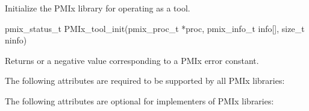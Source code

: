 \summary

Initialize the \ac{PMIx} library for operating as a tool.

\format

\cspecificstart
\begin{codepar}
pmix_status_t
PMIx_tool_init(pmix_proc_t *proc,
               pmix_info_t info[], size_t ninfo)
\end{codepar}
\cspecificend

\begin{arglist}
\end{arglist}

Returns  or a negative value corresponding to a PMIx error constant.

\reqattrstart
The following attributes are required to be supported by all \ac{PMIx} libraries:


\reqattrend

\optattrstart
The following attributes are optional for implementers of \ac{PMIx} libraries:

